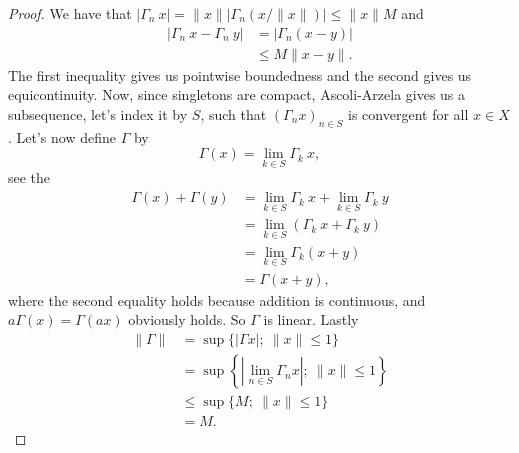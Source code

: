 \documentclass[a4paper,12pt,twoside,BCOR=10mm]{scrbook}
\theoremstyle{definition}
\theoremstyle{definition}
\theoremstyle{definition}
\begin{document}
\begin{proof}
We have that $|\Gamma_n\ x| = \|x\| |\Gamma_n (x/\|x\|)| \leq \|x\| M$ and
\begin{align*}
	|\Gamma_n\ x - \Gamma_n\ y|
	&= |\Gamma_n (x - y)|\\
	&\leq M\|x - y\|.
\end{align*}
The first inequality gives us pointwise boundedness and the second gives us equicontinuity.
Now, since singletons are compact, Ascoli-Arzela gives us a subsequence, let's index it by $S$, such that $(\Gamma_n x)_{n \in S}$ is convergent for all $x \in X$.
Let's now define $\Gamma$ by
\[
	\Gamma(x) = \lim_{k \in S} \Gamma_k\ x,
\]
see the
\begin{align*}
	\Gamma(x) + \Gamma(y)
	&= \lim_{k \in S} \Gamma_k\ x + \lim_{k \in S} \Gamma_k\ y\\
	&= \lim_{k \in S} \left ( \Gamma_k\ x + \Gamma_k\ y \right )\\
	&= \lim_{k \in S} \Gamma_k(x + y)\\
	&= \Gamma(x + y),
\end{align*}
where the second equality holds because addition is continuous, and $a\Gamma(x) = \Gamma(ax)$ obviously holds.
So $\Gamma$ is linear.
Lastly
\begin{align*}
	\|\Gamma\|
	&= \sup \{|\Gamma x|;\ \|x\| \leq 1\}\\
	&= \sup \left \{ \left |\lim_{n \in S} \Gamma_n x \right|;\ \|x\| \leq 1 \right \}\\
	&\leq \sup \{ M;\ \|x\| \leq 1 \}\\
	&= M.
\end{align*}
\end{proof}
\end{document}
